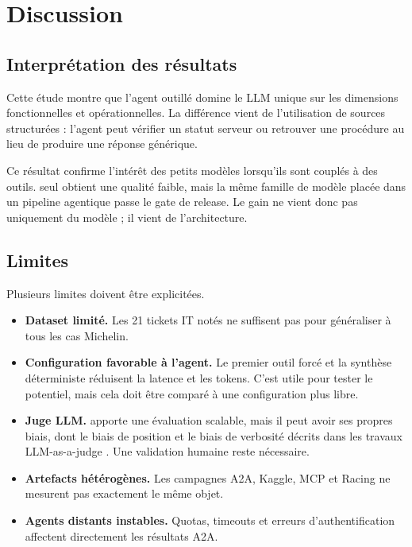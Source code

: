 
\chapter{Discussion}

\section{Interprétation des résultats}

Cette étude montre que l'agent outillé domine le LLM unique sur les
dimensions fonctionnelles et opérationnelles. La différence vient de
l'utilisation de sources structurées : l'agent peut vérifier un statut serveur
ou retrouver une procédure au lieu de produire une réponse générique.

Ce résultat confirme l'intérêt des petits modèles lorsqu'ils sont couplés à des
outils.  seul obtient une qualité faible, mais la même famille
de modèle placée dans un pipeline agentique passe le gate de release. Le gain ne
vient donc pas uniquement du modèle ; il vient de l'architecture.

\section{Limites}

Plusieurs limites doivent être explicitées.

\begin{itemize}
  \item \textbf{Dataset limité.} Les 21 tickets IT notés ne suffisent pas pour
  généraliser à tous les cas Michelin.
  \item \textbf{Configuration favorable à l'agent.} Le premier outil forcé et
  la synthèse déterministe réduisent la latence et les tokens. C'est utile pour
  tester le potentiel, mais cela doit être comparé à une configuration plus
  libre.
  \item \textbf{Juge LLM.}  apporte une évaluation scalable, mais
  il peut avoir ses propres biais, dont le biais de position et le biais de
  verbosité décrits dans les travaux LLM-as-a-judge \cite{llmjudge2023}. Une
  validation humaine reste nécessaire.
  \item \textbf{Artefacts hétérogènes.} Les campagnes A2A, Kaggle, MCP et
  Racing ne mesurent pas exactement le même objet.
  \item \textbf{Agents distants instables.} Quotas, timeouts et erreurs
  d'authentification affectent directement les résultats A2A.
\end{itemize}


